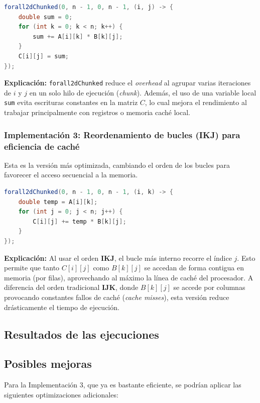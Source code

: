 \documentclass[12pt,a4paper]{article}
\begin{document}
\begin{lstlisting}[language=Java, caption=Multiplicación de matrices con chunking y acumulador.]
forall2dChunked(0, n - 1, 0, n - 1, (i, j) -> {
    double sum = 0;
    for (int k = 0; k < n; k++) {
        sum += A[i][k] * B[k][j];
    }
    C[i][j] = sum;
});
\end{lstlisting}

\textbf{Explicación:} \texttt{forall2dChunked} reduce el \textit{overhead} al agrupar varias iteraciones de $i$ y $j$ en un solo hilo de ejecución (\textit{chunk}). Además, el uso de una variable local \texttt{sum} evita escrituras constantes en la matriz $C$, lo cual mejora el rendimiento al trabajar principalmente con registros o memoria caché local.

\subsubsection{Implementación 3: Reordenamiento de bucles (IKJ) para eficiencia de caché}
Esta es la versión más optimizada, cambiando el orden de los bucles para favorecer el acceso secuencial a la memoria.

\begin{lstlisting}[language=Java, caption=Multiplicación de matrices con reordenamiento IKJ.]
forall2dChunked(0, n - 1, 0, n - 1, (i, k) -> {
    double temp = A[i][k];
    for (int j = 0; j < n; j++) {
        C[i][j] += temp * B[k][j];
    }
});
\end{lstlisting}

\textbf{Explicación:} Al usar el orden \textbf{IKJ}, el bucle más interno recorre el índice $j$. Esto permite que tanto $C[i][j]$ como $B[k][j]$ se accedan de forma contigua en memoria (por filas), aprovechando al máximo la línea de caché del procesador. A diferencia del orden tradicional \textbf{IJK}, donde $B[k][j]$ se accede por columnas provocando constantes fallos de caché (\textit{cache misses}), esta versión reduce drásticamente el tiempo de ejecución.

\subsection{Resultados de las ejecuciones}

\subsection{Posibles mejoras}
Para la Implementación 3, que ya es bastante eficiente, se podrían aplicar las siguientes optimizaciones adicionales:
\end{document}
